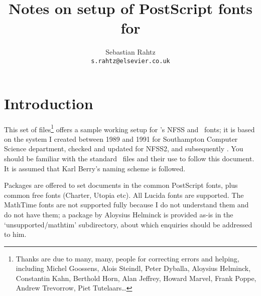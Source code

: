 \documentclass{article}
\begin{document}
\MakeShortVerb{+}
\title{Notes on setup of PostScript fonts for \LaTeXe}
\author{Sebastian Rahtz\\\texttt{s.rahtz@elsevier.co.uk}}
\date{\filedate}
\maketitle
%
\tableofcontents
\section{Introduction}

This set of files\footnote{Thanks are due to many, many, people for
  correcting errors and helping, including Michel Goossens, Alois
  Steindl, Peter Dyballa, Aloysius
  Helminck, Constantin Kahn, Berthold Horn, Alan Jeffrey, 
  Howard Marvel, Frank Poppe, 
  Andrew Trevorrow, Piet Tutelaars\ldots} offers a sample working setup for \LaTeXe's
NFSS and \PS\ fonts; it is based on the system I created between 1989
and 1991 for Southampton Computer Science department, checked and
updated for NFSS2, and subsequently \LaTeXe.  You should be familiar with
the standard \LaTeXe\ files and their use to follow this document.
It is assumed that Karl Berry's naming scheme is followed.  

Packages are offered to set documents in the common PostScript fonts,
plus common free fonts (Charter, Utopia etc).  All Lucida fonts are
supported. The MathTime fonts are not supported fully because
I do not understand them and do not have them; a package by Aloysius
Helminck is provided as-is in the `unsupported/mathtim'
subdirectory, about which enquiries should be addressed
to him.  
\end{document}
